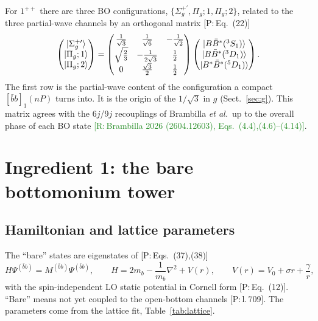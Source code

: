 \documentclass[11pt,a4paper]{article}
\newcommand{\tagP}[1]{\textcolor{blue!65!black}{\textsf{\small[P:\,#1]}}}
\newcommand{\tagR}[1]{\textcolor{ForestGreen}{\textsf{\small[R:\,#1]}}}
\newcommand{\BBst}{B\bar B^*}
\newcommand{\BstBst}{B^*\bar B^*}
\renewcommand{\bbnP}{[\bar bb]_1(nP)}
\begin{document}
For $1^{++}$ there are three BO configurations, $\{\Sigma_g^{+\prime},\Pi_g;1,\Pi_g;2\}$, related to the three partial-wave channels by an orthogonal matrix \tagP{Eq.~(22)}
\begin{equation}
\begin{pmatrix}\ket{\Sigma_g^{+\prime}}\\ \ket{\Pi_g;1}\\ \ket{\Pi_g;2}\end{pmatrix}
=\begin{pmatrix}\frac{1}{\sqrt3}&\frac{1}{\sqrt6}&-\frac{1}{\sqrt2}\\[1mm] \sqrt{\frac23}&-\frac{1}{2\sqrt3}&\frac12\\[1mm] 0&\frac{\sqrt3}{2}&\frac12\end{pmatrix}
\begin{pmatrix}\ket{\BBst(^3S_1)}\\ \ket{\BBst(^3D_1)}\\ \ket{\BstBst(^5D_1)}\end{pmatrix}.
\label{eq:BOmatrix}
\end{equation}
The first row is the partial-wave content of the configuration a compact $\bbnP$ turns into. It is the origin of the $1/\sqrt3$ in $g$ (Sect.~\ref{sec:g}). This matrix agrees with the 6$j$/9$j$ recouplings of Brambilla \emph{et al.}\ up to the overall phase of each BO state \tagR{Brambilla 2026 (2604.12603), Eqs.~(4.4),(4.6)--(4.14)}.

\section{Ingredient 1: the bare bottomonium tower}
\label{sec:tower}

\subsection{Hamiltonian and lattice parameters}

The ``bare'' states are eigenstates of \tagP{Eqs.~(37),(38)}
\begin{equation}
H\Psi^{(\bar bb)}=M^{(\bar bb)}\Psi^{(\bar bb)},\qquad H=2m_b-\frac{1}{m_b}\nabla^2+V(r),\qquad V(r)=V_0+\sigma r+\frac{\gamma}{r},
\end{equation}
with the spin-independent LO static potential in Cornell form \tagP{Eq.~(12)}. ``Bare'' means not yet coupled to the open-bottom channels \tagP{l.\,709}. The parameters come from the lattice fit, Table~\ref{tab:lattice}.
\end{document}
